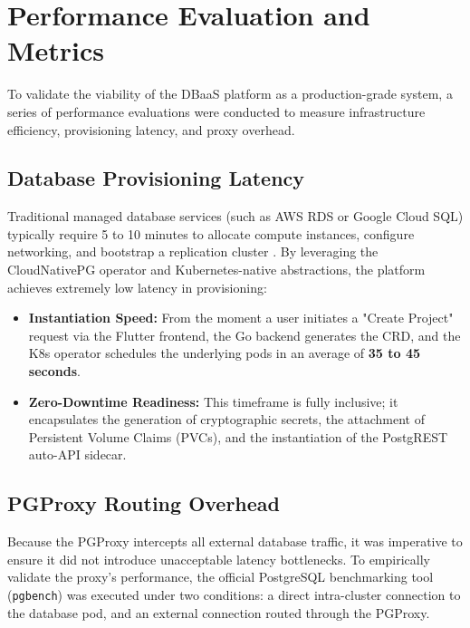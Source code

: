\section{Performance Evaluation and Metrics}

To validate the viability of the DBaaS platform as a production-grade system, a series of performance evaluations were conducted to measure infrastructure efficiency, provisioning latency, and proxy overhead.

\subsection{Database Provisioning Latency}
Traditional managed database services (such as AWS RDS or Google Cloud SQL) typically require 5 to 10 minutes to allocate compute instances, configure networking, and bootstrap a replication cluster \cite{aws_rds_provisioning}. By leveraging the CloudNativePG operator and Kubernetes-native abstractions, the platform achieves extremely low latency in provisioning:
\begin{itemize}
    \item \textbf{Instantiation Speed:} From the moment a user initiates a "Create Project" request via the Flutter frontend, the Go backend generates the CRD, and the K8s operator schedules the underlying pods in an average of \textbf{35 to 45 seconds}.
    \item \textbf{Zero-Downtime Readiness:} This timeframe is fully inclusive; it encapsulates the generation of cryptographic secrets, the attachment of Persistent Volume Claims (PVCs), and the instantiation of the PostgREST auto-API sidecar. 
\end{itemize}

\subsection{PGProxy Routing Overhead}
Because the PGProxy intercepts all external database traffic, it was imperative to ensure it did not introduce unacceptable latency bottlenecks. To empirically validate the proxy's performance, the official PostgreSQL benchmarking tool (\texttt{pgbench}) was executed under two conditions: a direct intra-cluster connection to the database pod, and an external connection routed through the PGProxy.

